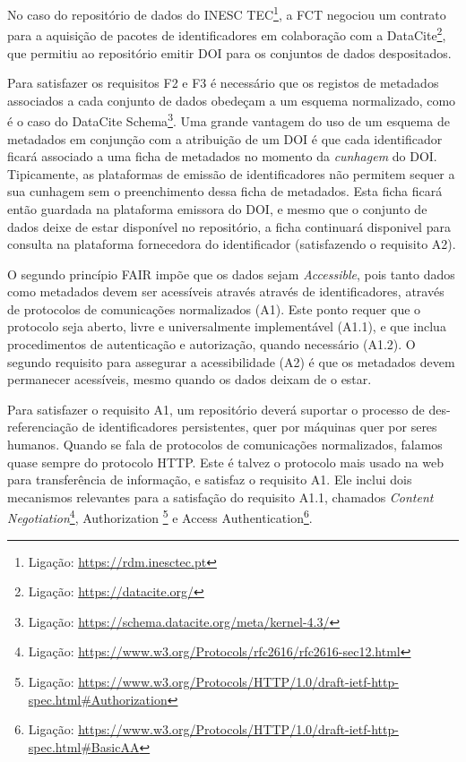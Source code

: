 \documentclass[sigconf,nonacm]{acmart}
\begin{document}
No caso do repositório de dados do INESC TEC\footnote{Ligação: \url{https://rdm.inesctec.pt}}, a FCT negociou um contrato para a aquisição de pacotes de identificadores em colaboração com a DataCite\footnote{Ligação: \url{https://datacite.org/}}, que permitiu ao repositório emitir DOI para os conjuntos de dados despositados. 

Para satisfazer os requisitos F2 e F3 é necessário que os registos de metadados associados a cada conjunto de dados obedeçam a um esquema normalizado, como é o caso do DataCite Schema\footnote{Ligação: \url{https://schema.datacite.org/meta/kernel-4.3/}}. Uma grande vantagem do uso de um esquema de metadados em conjunção com a atribuição de um DOI é que cada identificador ficará associado a uma ficha de metadados no momento da \emph{cunhagem} do DOI. Tipicamente, as plataformas de emissão de identificadores não permitem sequer a sua cunhagem sem o preenchimento dessa ficha de metadados. Esta ficha ficará então guardada na plataforma emissora do DOI, e mesmo que o conjunto de dados deixe de estar disponível no repositório, a ficha continuará disponivel para consulta na plataforma fornecedora do identificador (satisfazendo o requisito A2).

O segundo princípio FAIR impõe que os dados sejam \emph{Accessible}, pois tanto dados como metadados devem ser acessíveis através através de identificadores, através de protocolos de comunicações normalizados (A1). Este ponto requer que o protocolo seja aberto, livre e universalmente implementável (A1.1), e que inclua procedimentos de autenticação e autorização, quando necessário (A1.2). O segundo requisito para assegurar a acessibilidade (A2) é que os metadados devem permanecer acessíveis, mesmo quando os dados deixam de o estar.

Para satisfazer o requisito A1, um repositório deverá suportar o processo de des-referenciação de identificadores persistentes, quer por máquinas quer por seres humanos. Quando se fala de protocolos de comunicações normalizados, falamos quase sempre do protocolo HTTP. Este é talvez o protocolo mais usado na web para transferência de informação, e satisfaz o requisito A1. Ele inclui dois mecanismos relevantes para a satisfação do requisito A1.1, chamados \emph{Content Negotiation}\footnote{Ligação: \url{https://www.w3.org/Protocols/rfc2616/rfc2616-sec12.html}}, Authorization \footnote{Ligação: \url{https://www.w3.org/Protocols/HTTP/1.0/draft-ietf-http-spec.html\#Authorization}} e Access Authentication\footnote{Ligação: \url{https://www.w3.org/Protocols/HTTP/1.0/draft-ietf-http-spec.html\#BasicAA}}. 
\end{document}
